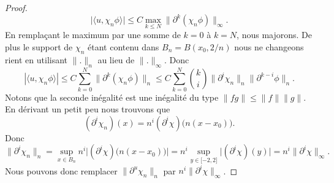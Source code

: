 \begin{proof}
        \begin{equation}
            \big| \langle u, \chi_n\phi\rangle  \big|\leq C\max_{k\leq N}\| \partial^k(\chi_n\phi) \|_{\infty}.
        \end{equation}
        En remplaçant le maximum par une somme de \( k=0\) à \( k=N\), nous majorons. De plus le support de \( \chi_n\) étant contenu dans \( B_n=B(x_0,2/n)\) nous ne changeons rient en utilisant \( \| . \|_n\) au lieu de \( \| . \|_{\infty}\). Donc
        \begin{equation}
            | \langle u, \chi_n\phi\rangle  |\leq C\sum_{k=0}^N\| \partial^k(\chi_n\phi) \|_n\leq C\sum_{k=0}^N\binom{ k }{ i }\| \partial^i\chi_n \|_n\| \partial^{k-i}\phi \|_n.
        \end{equation}
        Notons que la seconde inégalité est une inégalité du type \( \| fg \|\leq \| f \|\| g \|\). En dérivant un petit peu nous trouvons que
        \begin{equation}
            (\partial^i\chi_n)(x)=n^i(\partial^i\chi)\big( n(x-x_0) \big).
        \end{equation}
        Donc
        \begin{equation}    \label{EqFKWTooFfZoSM}
            \| \partial^i\chi_n \|_n=\sup_{x\in B_n}n^i\big| (\partial^i\chi)\big( n(x-x_0) \big) \big|=n^i\sup_{y\in\mathopen[ -2 , 2 \mathclose]}\big| (\partial^i\chi)(y) \big|=n^i\| \partial^i\chi \|_{\infty}.
        \end{equation}
        Nous pouvons donc remplacer \( \| \partial^u\chi_n \|_n\) par \( n^i\| \partial^i\chi \|_{\infty}\).


\end{proof}
